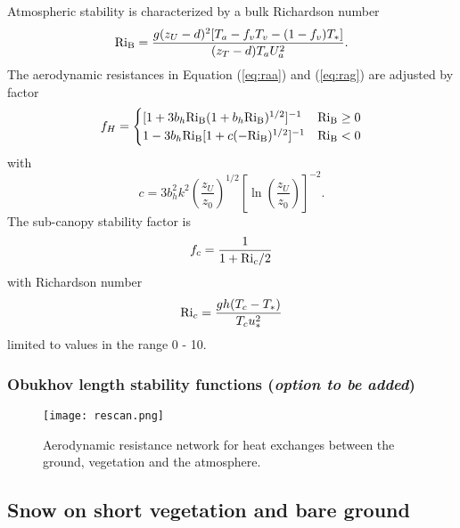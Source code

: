 \documentclass{article}
\begin{document}
Atmospheric stability is characterized by a bulk Richardson number
\begin{equation}
{\rm Ri_B} = \frac{g(z_U-d)^2[T_a - f_vT_v - (1-f_v)T_*]}{(z_T-d) T_a U_a^2}.
\end{equation}
The aerodynamic resistances in Equation (\ref{eq:raa}) and (\ref{eq:rag}) are adjusted by factor
\begin{equation}
f_H  = \begin{cases} 
       [1 + 3b_h{\rm Ri_B}(1 + b_h{\rm Ri_B})^{1/2}]^{-1}  & {\rm Ri_B} \geq 0 \\
        1 - 3b_h{\rm Ri_B}[1 + c(-{\rm Ri_B})^{1/2}]^{-1}  & {\rm Ri_B} < 0
\end{cases}
\end{equation}
with 
\begin{equation}
c = 3b_h^2k^2\left(\frac{z_U}{z_0}\right)^{1/2}\left[\ln\left(\frac{z_U}{z_0}\right)\right]^{-2}.
\end{equation}
The sub-canopy stability factor is
\begin{equation}
f_c = \frac{1}{1 + {\rm Ri}_c/2}
\end{equation}
with Richardson number
\begin{equation}
{\rm Ri}_c = \frac{gh(T_c - T_*)}{T_c u_*^2}
\end{equation}
limited to values in the range 0 - 10.

\subsubsection{Obukhov length stability functions ({\it option to be added})}

\begin{figure}[t]
\texttt{[image: rescan.png]}
\caption{Aerodynamic resistance network for heat exchanges between the ground, vegetation and the atmosphere.}
\label{fig:rescan}
\end{figure}

\subsection{Snow on short vegetation and bare ground}
\end{document}
